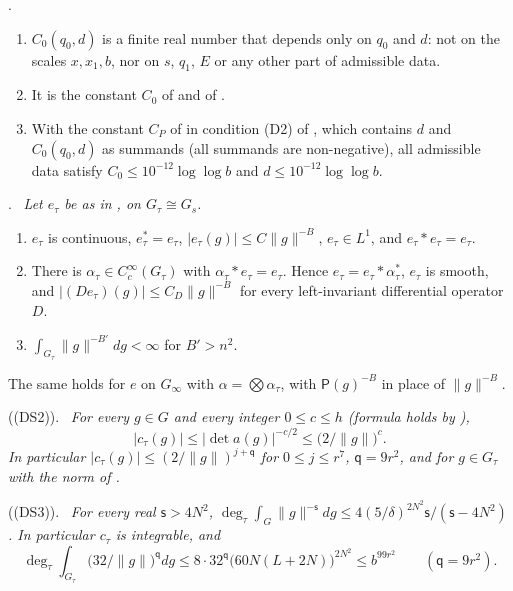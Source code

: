 \documentclass[10pt]{amsart}
\theoremstyle{definition}
\theoremstyle{remark}
\providecommand{\pbdeg}{\operatorname{deg}}
\providecommand{\pbeq}{\mathsf q}
\providecommand{\pmP}{\mathsf P}
\newenvironment{quotedthm}[2]{\par\medskip\noindent\begingroup
  \textbf{#1}#2.\ \itshape\ignorespaces}{\endgroup\par\medskip}
\begin{document}
\begin{quotedthm}{\cite[Lemma~8.7]{P49}}{}
\begin{enumerate}
\item[(a)] $C_0(q_0,d)$ is a finite real number that depends only on $q_0$ and $d$: not on the
scales $x,x_1,b$, nor on $s$, $q_1$, $E$ or any other part of admissible data.
\item[(b)] It is the constant $C_0$ of {\cite[Proposition~5.27]{P49}} and of {\cite[Lemma~5.7{\rm(ii)}]{P49}}.
\item[(c)] With the constant $C_P$ of {\cite[(35)]{P46}} in condition {\rm(D2)} of
{\cite[Definition~13.3]{P46}}, which contains $d$ and $C_0(q_0,d)$ as summands (all summands are
non-negative), all admissible data satisfy
$C_0\le10^{-12}\log\log b$ and $d\le10^{-12}\log\log b$.
\end{enumerate}
\end{quotedthm}

\begin{quotedthm}{\cite[Lemma~4.7]{P51}}{}
Let $e_\tau$ be as in {\cite[(42)]{P51}}, on $G_\tau\cong G_s$.
\begin{enumerate}
\item[(a)] $e_\tau$ is continuous, $e_\tau^*=e_\tau$, $|e_\tau(g)|\le C\|g\|^{-B}$,
$e_\tau\in L^1$, and $e_\tau*e_\tau=e_\tau$.
\item[(b)] There is $\alpha_\tau\in C_c^\infty(G_\tau)$ with $\alpha_\tau*e_\tau=e_\tau$. Hence
$e_\tau=e_\tau*\alpha_\tau^*$, $e_\tau$ is smooth, and $|(De_\tau)(g)|\le C_D\|g\|^{-B}$ for every
left-invariant differential operator $D$.
\item[(c)] $\int_{G_\tau}\|g\|^{-B'}dg<\infty$ for $B'>n^2$.
\end{enumerate}
The same holds for $e$ on $G_\infty$ with $\alpha=\bigotimes\alpha_\tau$, with $\pmP(g)^{-B}$ in place
of $\|g\|^{-B}$.
\end{quotedthm}

\begin{quotedthm}{\cite[Theorem~5.6]{P51}}{ (\textup{(DS2)})}
For every $g\in G$ and every integer $0\le c\le h$ (formula {\cite[(59)]{P51}} holds by {\cite[Theorem~3.17]{P49}}),
\[
|c_\tau(g)|\le|\det a(g)|^{-c/2}\le\bigl(2/\|g\|\bigr)^c .
\]
In particular $|c_\tau(g)|\le(2/\|g\|)^{j+\pbeq}$ for $0\le j\le r^7$, $\pbeq=9r^2$, and for $g\in
G_\tau$ with the norm of {\cite[\S3.2.1]{P51}}.
\end{quotedthm}

\begin{quotedthm}{\cite[Theorem~5.9]{P51}}{ (\textup{(DS3)})}
For every real $\mathsf s>4N^2$, $\pbdeg_\tau\int_G\|g\|^{-\mathsf s}dg\le4(5/\delta)^{2N^2}\mathsf s/
(\mathsf s-4N^2)$. In particular $c_\tau$ is integrable, and
\[
\pbdeg_\tau\int_{G_\tau}\bigl(32/\|g\|\bigr)^{\pbeq}dg\le8\cdot32^{\pbeq}\bigl(60N(L+2N)\bigr)^{2N^2}
\le b^{99r^2}\qquad(\pbeq=9r^2).
\]
\end{quotedthm}
\end{document}
